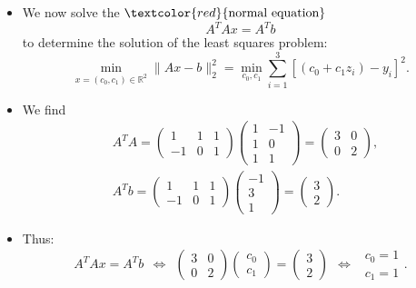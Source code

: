 {\begin{enumerate}
\begin{itemize}
$$			\Bigg\lVert{\begin{pmatrix}f(z_1)-y_1\\f(z_2)-y_2\\f(z_3)-y_3\end{pmatrix}}\\
			\Bigg\rVert_2^2\stackrel{\textcolor{blue}{\text{Def. of}\ \|{\cdot}\|_2}}{=}\sum_{i=1}^{3}(f(z_i)-y_i)^2.
			$$
			\item 
			We now solve the $\textcolor{red}{\text{normal equation}}$ $$A^TAx = A^Tb$$
			to determine the solution of the least squares problem:
			$$
			\min_{x=(c_0,c_1)\in\mathbb{R}^2} \|{Ax-b}\|_2^2 = \min_{c_0,c_1}\sum_{i=1}^{3}[(c_0+c_1z_i)-y_i]^2.
			$$
			\item 
			We find
			\begin{align*} 
			&A^TA = \begin{pmatrix}1&1&1\\-1&0&1\end{pmatrix}
			\begin{pmatrix}1&-1\\1&0\\1&1\end{pmatrix} =\begin{pmatrix}3&0\\0&2\end{pmatrix},\\
			&A^Tb =\begin{pmatrix}1&1&1\\-1&0&1\end{pmatrix}\begin{pmatrix}-1\\3\\1\end{pmatrix}=\begin{pmatrix}3\\2\end{pmatrix}.
			\end{align*}
			\item 
			Thus:
			$$
			A^TAx = A^Tb~~\Leftrightarrow~~ \begin{pmatrix}3&0\\0&2\end{pmatrix}
			\begin{pmatrix}c_0\\c_1\end{pmatrix}
			=\begin{pmatrix}3\\2\end{pmatrix}~~ \Leftrightarrow~~ \begin{matrix}c_0=1\\c_1=1\end{matrix}.$$

\end{itemize}
\end{enumerate}}
